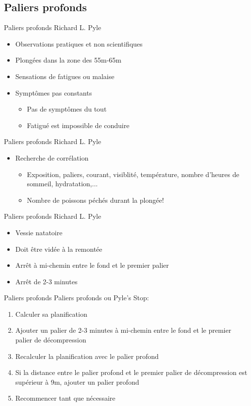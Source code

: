\subsection{Paliers profonds}

\begin{frame}{Paliers profonds}
	Richard L. Pyle
	\begin{itemize}
		\item Observations pratiques et non scientifiques
		\item Plongées dans la zone des 55m-65m
		\item Sensations de fatigues ou malaise
		\item Symptômes pas constants
		\begin{itemize}
			\item Pas de symptômes du tout
			\item Fatigué est impossible de conduire
		\end{itemize}
	\end{itemize}
\end{frame}

\begin{frame}{Paliers profonds}
	Richard L. Pyle
	\begin{itemize}
	 	\item Recherche de corrélation
	 	\begin{itemize}
	 		\item Exposition, paliers, courant, visiblité, température, nombre d'heures de sommeil, hydratation,...
	 		\item Nombre de poissons péchés durant la plongée!
	 	\end{itemize}
	\end{itemize} 	
\end{frame}

\begin{frame}{Paliers profonds}
	Richard L. Pyle
	\begin{itemize}
	 	\item Vessie natatoire
	 	\item Doit être vidée à la remontée
	 	\item Arrêt à mi-chemin entre le fond et le premier palier
	 	\item Arrêt de 2-3 minutes
	\end{itemize} 	
\end{frame}

\begin{frame}{Paliers profonds}
	Paliers profonds ou Pyle's Stop:
	\begin{enumerate}
		\item Calculer sa planification
		\item Ajouter un palier de 2-3 minutes à mi-chemin entre le fond et le premier palier de décompression
		\item Recalculer la planification avec le palier profond
		\item Si la distance entre le palier profond et le premier palier de décompression est supérieur à 9m, ajouter un palier profond
		\item Recommencer tant que nécessaire
	\end{enumerate}	
\end{frame}

